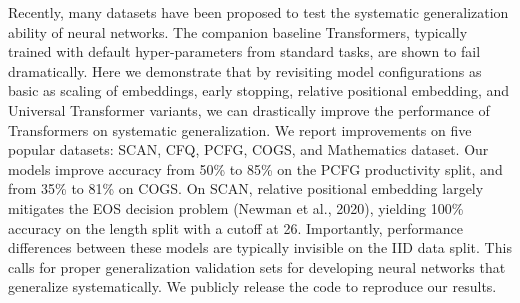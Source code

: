 Recently, many datasets have been proposed to test the systematic generalization ability of neural networks. The companion baseline Transformers, typically trained with default hyper-parameters from standard tasks, are shown to fail dramatically. Here we demonstrate that by revisiting model configurations as basic as scaling of embeddings, early stopping, relative positional embedding, and Universal Transformer variants, we can drastically improve the performance of Transformers on systematic generalization. We report improvements on five popular datasets: SCAN, CFQ, PCFG, COGS, and Mathematics dataset. Our models improve accuracy from 50\% to 85\% on the PCFG productivity split, and from 35\% to 81\% on COGS. On SCAN, relative positional embedding largely mitigates the EOS decision problem (Newman et al., 2020), yielding 100\% accuracy on the length split with a cutoff at 26. Importantly, performance differences between these models are typically invisible on the IID data split. This calls for proper generalization validation sets for developing neural networks that generalize systematically. We publicly release the code to reproduce our results.
